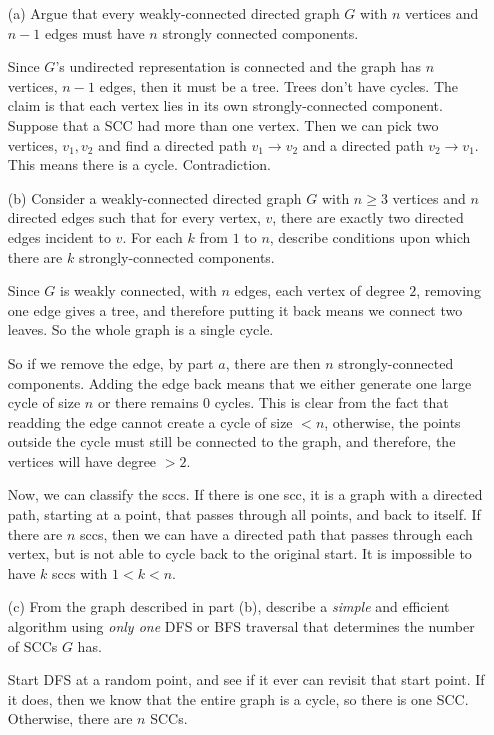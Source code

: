 \documentclass{article}
\begin{document}
    \begin{itemize}
        \item [(a)] Argue that every weakly-connected directed graph $G$ with $n$ vertices and $n - 1$ edges must have $n$ strongly connected components.
            \begin{answer}
                Since $G$'s undirected representation is connected and the graph has $n$ vertices, $n - 1$ edges, then it must be a tree. Trees don't have cycles. The claim is that each vertex lies in its own strongly-connected component. Suppose that a SCC had more than one vertex. Then we can pick two vertices, $v_{1}, v_{2}$ and find a directed path $v_{1} \rightarrow v_{2}$ and a directed path $v_{2} \rightarrow v_{1}$. This means there is a cycle. Contradiction.
            \end{answer}

        \item [(b)] Consider a weakly-connected directed graph $G$ with $n \geq 3$ vertices and $n$ directed edges such that for every vertex, $v$, there are exactly two directed edges incident to $v$. For each $k$ from $1$ to $n$, describe conditions upon which there are $k$ strongly-connected components.
            \begin{answer}
                Since $G$ is weakly connected, with $n$ edges, each vertex of degree $2$, removing one edge gives a tree, and therefore putting it back means we connect two leaves. So the whole graph is a single cycle.

                So if we remove the edge, by part $a$, there are then $n$ strongly-connected components. Adding the edge back means that we either generate one large cycle of size $n$ or there remains $0$ cycles. This is clear from the fact that readding the edge cannot create a cycle of size $< n$, otherwise, the points outside the cycle must still be connected to the graph, and therefore, the vertices will have degree $> 2$.

                Now, we can classify the sccs. If there is one scc, it is a graph with a directed path, starting at a point, that passes through all points, and back to itself. If there are $n$ sccs, then we can have a directed path that passes through each vertex, but is not able to cycle back to the original start. It is impossible to have $k$ sccs with $1 < k < n$.
            \end{answer}

        \item [(c)] From the graph described in part (b), describe a \textit{simple} and efficient algorithm using \textit{only one} DFS or BFS traversal that determines the number of SCCs $G$ has.
            \begin{answer}
                Start DFS at a random point, and see if it ever can revisit that start point. If it does, then we know that the entire graph is a cycle, so there is one SCC. Otherwise, there are $n$ SCCs.
            \end{answer}


\end{itemize}
\end{document}
